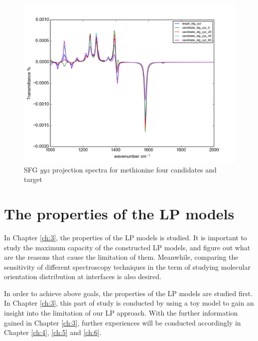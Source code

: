 \begin{figure}[!ht]
\centering
\includegraphics[scale=0.5]{Figures/Met_candidates_plotting_sfg_yyz.png}
\caption{SFG $yyz$ projection spectra for methionine four candidates and target} \label{fig:2.5}
\end{figure}

\section{The properties of the LP models}

In Chapter \ref{ch:3}, the properties of the LP models is studied. It is important to study the maximum capacity of the constructed LP models, and figure out what are the reasons that cause the limitation of them. Meanwhile, comparing the sensitivity of different spectroscopy techniques in the term of studying molecular orientation distribution at interfaces is also desired.

In order to achieve above goals, the properties of the LP models are studied first. In Chapter \ref{ch:3}, this part of study is conducted by using a toy model to gain an insight into the limitation of our LP approach. With the further information gained in Chapter \ref{ch:3}, further experiences will be conducted accordingly in Chapter \ref{ch:4}, \ref{ch:5} and \ref{ch:6}.

